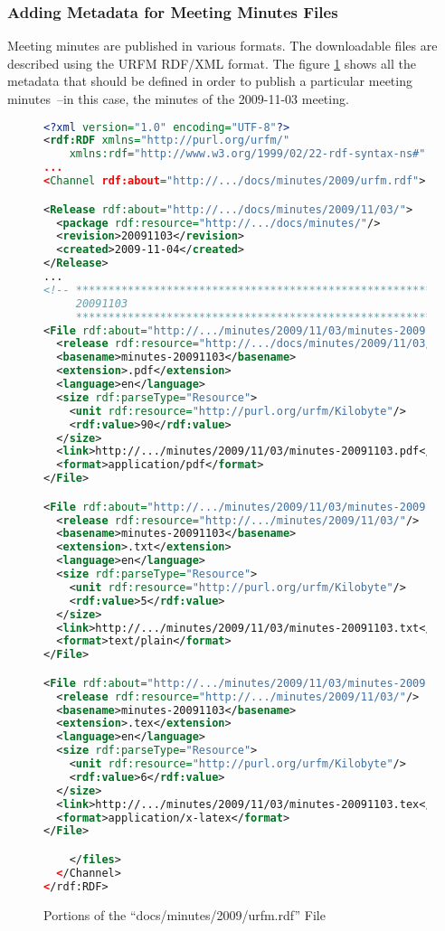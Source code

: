 \subsubsection{Adding Metadata for Meeting Minutes Files}\label{WebsitePublishingMinutesMetadata}

Meeting minutes are published in various formats. The downloadable files
are described using the URFM RDF/XML format. 
The figure \ref{WebsitePublishingMinutesMetadataURFM} shows all the 
metadata that should be defined in order to publish a particular meeting
minutes~--in this case, the minutes of the 2009-11-03 meeting.

\begin{figure}\caption{Portions of the ``docs/minutes/2009/urfm.rdf'' File}
\label{WebsitePublishingMinutesMetadataURFM}
\begin{lstlisting}[language=XML]
<?xml version="1.0" encoding="UTF-8"?>
<rdf:RDF xmlns="http://purl.org/urfm/"
    xmlns:rdf="http://www.w3.org/1999/02/22-rdf-syntax-ns#"
...
<Channel rdf:about="http://.../docs/minutes/2009/urfm.rdf">

<Release rdf:about="http://.../docs/minutes/2009/11/03/">
  <package rdf:resource="http://.../docs/minutes/"/>
  <revision>20091103</revision>
  <created>2009-11-04</created>
</Release>
...
<!-- *********************************************************
     20091103                                                 
     ********************************************************* -->
<File rdf:about="http://.../minutes/2009/11/03/minutes-20091103.pdf">
  <release rdf:resource="http://.../docs/minutes/2009/11/03/"/>
  <basename>minutes-20091103</basename>
  <extension>.pdf</extension>
  <language>en</language>
  <size rdf:parseType="Resource">
    <unit rdf:resource="http://purl.org/urfm/Kilobyte"/>
    <rdf:value>90</rdf:value>
  </size>
  <link>http://.../minutes/2009/11/03/minutes-20091103.pdf</link>
  <format>application/pdf</format>
</File>

<File rdf:about="http://.../minutes/2009/11/03/minutes-20091103.txt">
  <release rdf:resource="http://.../minutes/2009/11/03/"/>
  <basename>minutes-20091103</basename>
  <extension>.txt</extension>
  <language>en</language>
  <size rdf:parseType="Resource">
    <unit rdf:resource="http://purl.org/urfm/Kilobyte"/>
    <rdf:value>5</rdf:value>
  </size>
  <link>http://.../minutes/2009/11/03/minutes-20091103.txt</link>
  <format>text/plain</format>
</File>

<File rdf:about="http://.../minutes/2009/11/03/minutes-20091103.tex">
  <release rdf:resource="http://.../minutes/2009/11/03/"/>
  <basename>minutes-20091103</basename>
  <extension>.tex</extension>
  <language>en</language>
  <size rdf:parseType="Resource">
    <unit rdf:resource="http://purl.org/urfm/Kilobyte"/>
    <rdf:value>6</rdf:value>
  </size>
  <link>http://.../minutes/2009/11/03/minutes-20091103.tex</link>
  <format>application/x-latex</format>
</File>

    </files>
  </Channel>
</rdf:RDF>
\end{lstlisting}
\end{figure}

